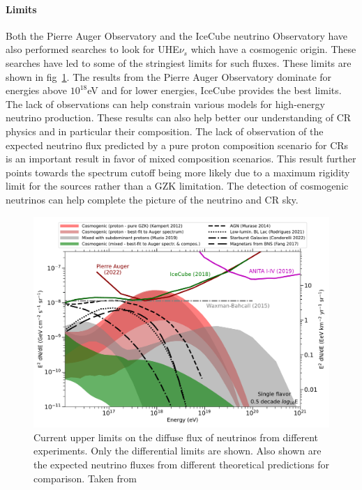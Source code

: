  \paragraph{Limits}
  \label{subsubsec:CosmoNuLimits}
  Both the Pierre Auger Observatory and the IceCube neutrino Observatory have also performed searches to look for UHE$\nu_s$ which have a cosmogenic origin. These searches have led to some of the stringiest limits for such fluxes. These limits are shown in fig~\ref{fig:Nu_limits_auger}. The results from the Pierre Auger Observatory dominate for energies above $10^{18}$eV and for lower energies, IceCube provides the best limits. The lack of observations can help constrain various models for high-energy neutrino production. These results can also help better our understanding of \gls{CR} physics and in particular their composition. The lack of observation of the expected neutrino flux predicted by a pure proton composition scenario for \glspl{CR} is an important result in favor of mixed composition scenarios. This result further points towards the spectrum cutoff being more likely due to a maximum rigidity limit for the sources rather than a GZK limitation. The detection of cosmogenic neutrinos can help complete the picture of the neutrino and \gls{CR} sky. 

\begin{figure}[t!]
  \centering
  \includegraphics[width=14.5cm]{thesis_figures/CRnNu/neutrinolimits_icrc2023_wiki.pdf}
  \caption{Current upper limits on the diffuse flux of neutrinos from different experiments. Only the differential limits are shown. Also shown are the expected neutrino fluxes from different theoretical predictions for comparison. Taken from~\cite{PierreAuger:2023pjg}}
  \label{fig:Nu_limits_auger}
\end{figure}

